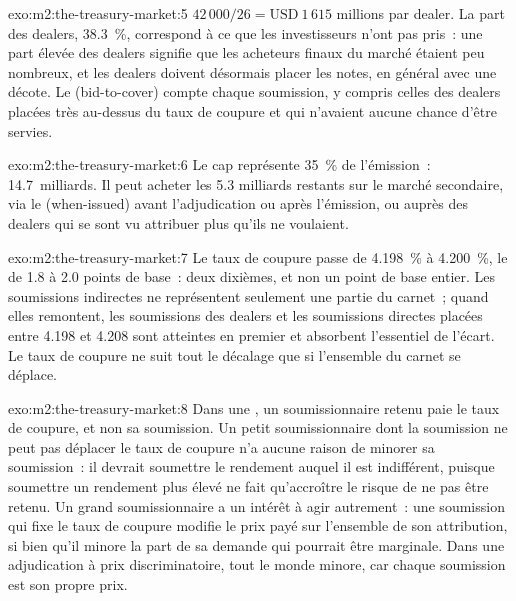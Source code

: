 \begin{solution}{exo:m2:the-treasury-market:5}
$42\,000/26 = \text{USD}~1\,615$ millions par dealer. La part des dealers, 38.3~\%, correspond
à ce que les investisseurs n'ont pas pris~: une part élevée des dealers signifie que les acheteurs finaux
du marché étaient peu nombreux, et les dealers doivent désormais placer les notes, en général avec une
décote. Le  (bid-to-cover) compte chaque soumission, y compris celles des dealers
placées très au-dessus du taux de coupure et qui n'avaient aucune chance d'être servies.
\end{solution}

\begin{solution}{exo:m2:the-treasury-market:6}
Le cap représente 35~\% de l'émission~: 14.7~milliards. Il peut acheter les 5.3
milliards restants sur le marché secondaire, via le  (when-issued) avant l'adjudication ou après
l'émission, ou auprès des dealers qui se sont vu attribuer plus qu'ils ne voulaient.
\end{solution}

\begin{solution}{exo:m2:the-treasury-market:7}
Le taux de coupure passe de 4.198~\% à 4.200~\%, le  de 1.8 à 2.0 points
de base~: deux dixièmes, et non un point de base entier. Les soumissions indirectes ne représentent
seulement une partie du carnet~; quand elles remontent, les soumissions des dealers et les soumissions directes placées entre
4.198 et 4.208 sont atteintes en premier et absorbent l'essentiel de l'écart. Le taux de coupure
ne suit tout le décalage que si l'ensemble du carnet se déplace.
\end{solution}

\begin{solution}{exo:m2:the-treasury-market:8}
Dans une , un soumissionnaire retenu paie le taux de coupure, et non sa soumission. Un
petit soumissionnaire dont la soumission ne peut pas déplacer le taux de coupure n'a aucune raison de minorer sa soumission~: il
devrait soumettre le rendement auquel il est indifférent, puisque soumettre un rendement plus élevé
ne fait qu'accroître le risque de ne pas être retenu. Un grand soumissionnaire a un intérêt à agir autrement~: une soumission qui fixe le
taux de coupure modifie le prix payé sur l'ensemble de son attribution, si bien qu'il minore la part de
sa demande qui pourrait être marginale. Dans une adjudication à prix discriminatoire, tout le monde minore,
car chaque soumission est son propre prix.
\end{solution}

